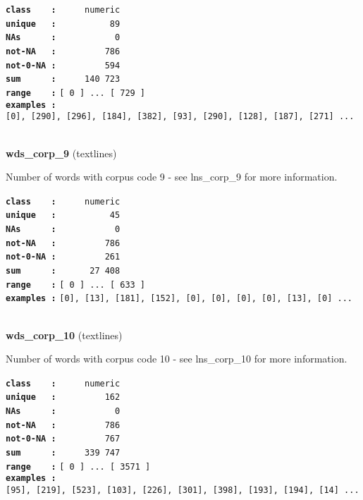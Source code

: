 \documentclass[]{article}
\begin{document}
\textbf{\texttt{class\ \ \ \ :}} \texttt{~~~~~numeric}\\
\textbf{\texttt{unique\ \ \ :}} \texttt{~~~~~~~~~~89}\\
\textbf{\texttt{NAs\ \ \ \ \ \ :}} \texttt{~~~~~~~~~~~0}\\
\textbf{\texttt{not-NA\ \ \ :}} \texttt{~~~~~~~~~786}\\
\textbf{\texttt{not-0-NA\ :}} \texttt{~~~~~~~~~594}\\
\textbf{\texttt{sum\ \ \ \ \ \ :}} \texttt{~~~~~140~723}\\
\textbf{\texttt{range\ \ \ \ :}}
\texttt{{[}\ 0\ {]}\ ...\ {[}\ 729\ {]}}\\
\textbf{\texttt{examples\ :}}
\texttt{{[}0{]},\ {[}290{]},\ {[}296{]},\ {[}184{]},\ {[}382{]},\ {[}93{]},\ {[}290{]},\ {[}128{]},\ {[}187{]},\ {[}271{]}\ ...}\\

~

\textbf{wds\_corp\_9} (textlines)

Number of words with corpus code 9 - see lns\_corp\_9 for more
information.

\textbf{\texttt{class\ \ \ \ :}} \texttt{~~~~~numeric}\\
\textbf{\texttt{unique\ \ \ :}} \texttt{~~~~~~~~~~45}\\
\textbf{\texttt{NAs\ \ \ \ \ \ :}} \texttt{~~~~~~~~~~~0}\\
\textbf{\texttt{not-NA\ \ \ :}} \texttt{~~~~~~~~~786}\\
\textbf{\texttt{not-0-NA\ :}} \texttt{~~~~~~~~~261}\\
\textbf{\texttt{sum\ \ \ \ \ \ :}} \texttt{~~~~~~27~408}\\
\textbf{\texttt{range\ \ \ \ :}}
\texttt{{[}\ 0\ {]}\ ...\ {[}\ 633\ {]}}\\
\textbf{\texttt{examples\ :}}
\texttt{{[}0{]},\ {[}13{]},\ {[}181{]},\ {[}152{]},\ {[}0{]},\ {[}0{]},\ {[}0{]},\ {[}0{]},\ {[}13{]},\ {[}0{]}\ ...}\\

~

\textbf{wds\_corp\_10} (textlines)

Number of words with corpus code 10 - see lns\_corp\_10 for more
information.

\textbf{\texttt{class\ \ \ \ :}} \texttt{~~~~~numeric}\\
\textbf{\texttt{unique\ \ \ :}} \texttt{~~~~~~~~~162}\\
\textbf{\texttt{NAs\ \ \ \ \ \ :}} \texttt{~~~~~~~~~~~0}\\
\textbf{\texttt{not-NA\ \ \ :}} \texttt{~~~~~~~~~786}\\
\textbf{\texttt{not-0-NA\ :}} \texttt{~~~~~~~~~767}\\
\textbf{\texttt{sum\ \ \ \ \ \ :}} \texttt{~~~~~339~747}\\
\textbf{\texttt{range\ \ \ \ :}}
\texttt{{[}\ 0\ {]}\ ...\ {[}\ 3571\ {]}}\\
\textbf{\texttt{examples\ :}}
\texttt{{[}95{]},\ {[}219{]},\ {[}523{]},\ {[}103{]},\ {[}226{]},\ {[}301{]},\ {[}398{]},\ {[}193{]},\ {[}194{]},\ {[}14{]}\ ...}\\
\end{document}
